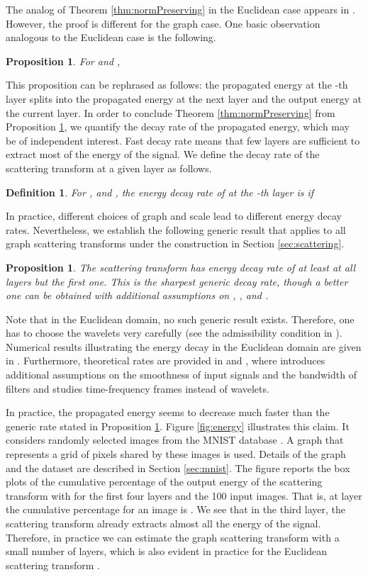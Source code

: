 \documentclass{article}
\newtheorem{proposition}[theorem]{Proposition}
\newtheorem{definition}{Definition}
\begin{document}
The analog of Theorem \ref{thm:normPreserving} in the Euclidean case appears in \cite[Theorem 2.6]{Mal13}. However, the proof is different for the graph case. One basic observation analogous to the Euclidean case is the following.
\begin{proposition}\label{prop:energySplit}
For  and ,

\end{proposition}
This proposition can be rephrased as follows: the propagated energy at the -th layer splits into the propagated energy at the next layer and the output energy at the current layer. In order to conclude Theorem \ref{thm:normPreserving} from Proposition \ref{prop:energySplit}, we quantify the decay rate of the propagated energy, which may be of independent interest. Fast decay rate means that few layers are sufficient to extract most of the energy of the signal. 
We define the decay rate of the scattering transform at a given layer as follows.
\begin{definition}
For ,  and ,  the  \emph{energy decay rate} of  at the -th layer is  if

\end{definition}
In practice, different choices of graph  and scale  lead to different energy decay rates. Nevertheless, we establish the following generic result that applies to all graph scattering transforms under the construction in Section \ref{sec:scattering}.
\begin{proposition}\label{prop:layer}
The scattering transform  has energy decay rate of at least  at all layers but the first one. This is the sharpest generic decay rate, though a better one can be obtained with additional assumptions on , ,  and .
\end{proposition}
Note that in the Euclidean domain, no such generic result exists. Therefore, one has to choose the wavelets very carefully (see the admissibility condition in \cite[Theorem 2.6]{Mal13}). Numerical results illustrating the energy decay in the Euclidean domain are given in \cite{BruM13}. Furthermore,  theoretical rates are provided in \cite{WiaGB17} and \cite{CzaL17}, where \cite{WiaGB17} introduces  additional assumptions on the smoothness of input signals and the bandwidth of filters 
and \cite{CzaL17} studies time-frequency frames instead of wavelets. 

In practice, the propagated energy seems to decrease much faster than the generic rate stated in Proposition \ref{prop:layer}. Figure \ref{fig:energy} illustrates this claim. It considers  randomly selected images from the MNIST database \cite{LecB98}. A graph that represents a grid of pixels shared by these images is used. Details of the graph and the dataset are described in Section \ref{sec:mnist}.
The figure reports the box plots of the cumulative percentage of the output energy of the scattering transform with  for the first four layers and the 100 input images. That is, at layer  the cumulative percentage for an image  is . 
We see that in the third layer, the scattering transform already extracts almost all the energy of the signal. Therefore, in practice we can estimate the graph scattering transform with a small number of layers, which is also evident in practice for the Euclidean scattering transform \cite{BruM13}.
 
\end{document}
